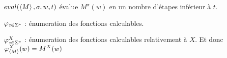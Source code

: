 \begin{definition}
	$eval(\left\langle M\right\rangle, \sigma,w,t)$ évalue $M^{\sigma}(w)$ en un nombre d'étapes inférieur à $t$.
\end{definition}


\begin{notation}
	$\varphi_{c \in \Sigma^{*}}$ : énumeration des fonctions calculables.

	$\varphi_{c \in \Sigma^{*}}^X$ : énumeration des fonctions calculables relativement à $X$. Et donc $\varphi_{\left\langle M\right\rangle}^X(w) = M^X(w)$
\end{notation}
